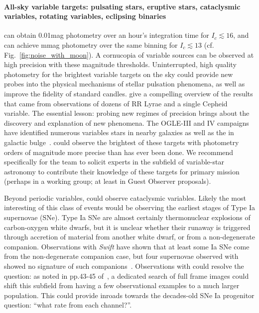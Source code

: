 \paragraph{All-sky variable targets: pulsating stars, eruptive stars, cataclysmic variables, rotating variables, eclipsing binaries}
\tess can obtain 0.01mag photometry over an hour's integration time for $I_c \lesssim 16$, and can achieve mmag photometry over the same binning for $I_c \lesssim 13$ (cf. Fig.~\ref{fig:noise_with_moon}).
A cornucopia of variable sources can be observed at high precision with these magnitude thresholds.
Uninterrupted, high quality \tess photometry for the brightest variable targets on the sky could provide new probes into the physical mechanisms of stellar pulsation phenomena, as well as improve the fidelity of standard candles.
\citet{szabo_k2SEPWP_2013} give a compelling overview of the results that came from \keplers observations of dozens of RR Lyrae and a single Cepheid variable.
The essential lesson: probing new regimes of precision brings about the discovery and explanation of new phenomena.
The OGLE-III and IV campaigns have identified numerous variables stars in nearby galaxies as well as the in galactic bulge~\citep{soszynski_LMC_2009,soszynski_SMC_2010,soszynski_bulge_2011}.
\tess could observe the brightest of these targets with photometry orders of magnitude more precise than has ever been done.
We recommend specifically for the \tess team to solicit experts in the subfield of variable-star astronomy to contribute their knowledge of these targets for \tesss primary mission (perhaps in a working group; at least in Guest Observer proposals).

Beyond periodic variables, \tess could observe cataclysmic variables.
Likely the most interesting of this class of events would be observing the earliest stages of Type Ia supernovae (SNe).
Type Ia SNe are almost certainly thermonuclear explosions of carbon-oxygen white dwarfs, but it is unclear whether their runaway is triggered through accretion of material from another white dwarf, or from a non-degenerate companion.
Observations with \textit{Swift} have shown that at least some Ia SNe come from the non-degenerate companion case, but four supernovae observed with \kepler showed no signature of such companions~\citep{cao_swift_Ia_2015,olling_kepler_Ia_2015}.
Observations with \tess could resolve the question: as noted in pp.43-45 of~\citet{science_definition_team_report_big_2016}, a dedicated search of \tesss full frame images could shift this subfield from having a few observational examples to a much larger population.
This could provide inroads towards the decades-old SNe Ia progenitor question: ``what rate from each channel?''.

